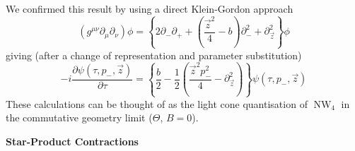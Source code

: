 \documentclass[14pt, a4paper, titlepage]{slides}
\DeclareMathOperator{\NW}{NW}
\newcommand{\lb}{\left(}
\newcommand{\rb}{\right)}
\begin{document}
We confirmed this result by using a direct Klein-Gordon approach
\begin{equation*}
  \lb g^{\mu\nu}\partial_\mu\partial_\nu\rb \phi =
  \left\{ 2\partial_-\partial_+ +\lb
    \frac{\vec{z}^2}{4}-b\rb\partial_-^2+\partial_{\vec{z}}^2\right\}\phi
\end{equation*}
giving (after a change of representation and parameter substitution)
\begin{equation*}
  \label{eq:NW:KG:KGSHO}
  -i\frac{\partial \psi\lb \tau,p_-,\vec{z}\rb}{\partial \tau}=
  \left\{ \frac{b}{2} - \frac{1}{2}\lb
    \frac{\vec{z}^2p_-^2}{4} - \partial_{\vec{z}}^2 \rb\right\}
  \psi\lb \tau,p_-,\vec{z}\rb
\end{equation*}
These calculations can be thought of as the light cone quantisation of $\NW_4$
in the commutative geometry limit ($\Theta$, $B=0$).

\textbf{Star-Product Contractions}
\end{document}
